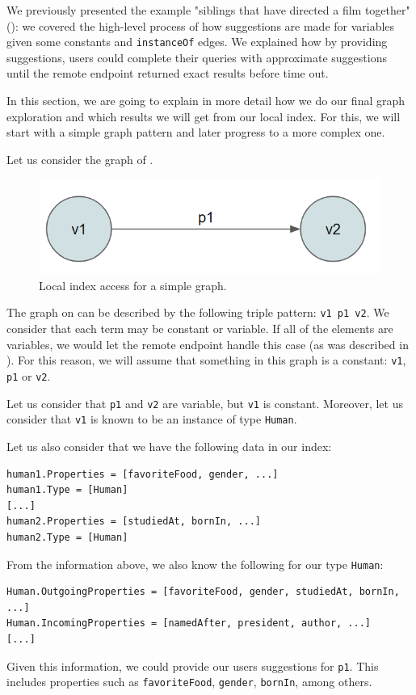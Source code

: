 We previously presented the example  "siblings that have directed a film together" (): we covered the high-level process of how suggestions are made for variables given some constants and \texttt{instanceOf} edges. We explained how by providing suggestions, users could complete their queries with approximate suggestions until the remote endpoint returned exact results before time out. 

In this section, we are going to explain in more detail how we do our final graph exploration and which results we will get from our local index. For this, we will start with a simple graph pattern and later progress to a more complex one.

\begin{example}
Let us consider the graph of .

\begin{figure}[H]
    \centering
        \includegraphics[width=0.5\linewidth]{imagenes/graph1.png}
        \caption{Local index access for a simple graph.}
        \label{fig:example_graph1}
\end{figure}

The graph on  can be described by the following triple pattern: \texttt{v1 p1 v2}. We consider that each term may be constant or variable. If all of the elements are variables, we would let the remote endpoint handle this case (as was described in ). For this reason, we will assume that something in this graph is a constant: \texttt{v1}, \texttt{p1} or \texttt{v2}.

Let us consider that \texttt{p1} and \texttt{v2} are variable, but \texttt{v1} is constant. Moreover, let us consider that \texttt{v1} is known to be an instance of type \texttt{Human}.

Let us also consider that we have the following data in our index:
\begin{verbatim}
human1.Properties = [favoriteFood, gender, ...]
human1.Type = [Human]
[...]
human2.Properties = [studiedAt, bornIn, ...]
human2.Type = [Human]
\end{verbatim}

From the information above, we also know the following for our type \texttt{Human}:
\begin{verbatim}
Human.OutgoingProperties = [favoriteFood, gender, studiedAt, bornIn, ...]
Human.IncomingProperties = [namedAfter, president, author, ...]
[...]
\end{verbatim}

Given this information, we could provide our users suggestions for \texttt{p1}. This includes properties such as \texttt{favoriteFood}, \texttt{gender}, \texttt{bornIn}, among others.

\end{example}

